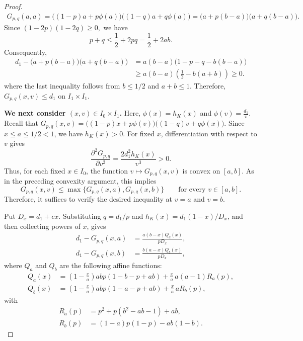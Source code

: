 \documentclass[11pt]{article}
\numberwithin{equation}{section}
\theoremstyle{definition}
\theoremstyle{remark}
\begin{document}
\begin{proof}
\begin{align*}
 G_{p,q}(a,a)
 =
 \bigl((1-p)a+p\phi(a)\bigr)
 \bigl((1-q)a+q\phi(a)\bigr)=
 \bigl(a+p(b-a)\bigr)
 \bigl(a+q(b-a)\bigr).
\end{align*}
Since
$
 (1-2p)(1-2q)\geq0,
$
we have
\begin{equation*}
 p+q\leq\frac12+2pq=\frac12+2ab.
\end{equation*}
Consequently,
\begin{align*}
 d_1-
 \bigl(a+p(b-a)\bigr)
 \bigl(a+q(b-a)\bigr)&=
 a(b-a)\bigl(1-p-q-b(b-a)\bigr)\\
 &\geq
 a(b-a)\left(\frac12-b(a+b)\right)\geq0.
\end{align*}
where the last inequality follows from $b\leq1/2$ and $a+b\leq1$.
Therefore, $G_{p,q}(x,v)\leq d_1$ on $I_1\times I_1$.

\textbf{We next consider $(x,v)\in I_0\times I_1$.} Here,
$
 \phi(x)=h_K(x)
$
and
$
 \phi(v)=\frac{d_1}{v}.
$
Recall that $G_{p,q}(x,v)
 =
 \bigl((1-p)x+p\phi(v)\bigr)
 \bigl((1-q)v+q\phi(x)\bigr).$
Since $x\leq a\leq1/2<1$, we have $h_K(x)>0$.
For fixed $x$, differentiation with respect to $v$ gives
\begin{equation*}
 \frac{\partial^2G_{p,q}}{\partial v^2}
 =
 \frac{2d_1^2h_K(x)}{v^3}>0.
\end{equation*}
Thus, for each fixed $x\in I_0$, the function
$v\mapsto G_{p,q}(x,v)$ is convex on $[a,b]$. As in the preceding
convexity argument, this implies
\begin{equation*}
 G_{p,q}(x,v)
 \leq
 \max\bigl\{G_{p,q}(x,a),G_{p,q}(x,b)\bigr\}
 \qquad\text{for every }v\in[a,b].
\end{equation*}
Therefore, it suffices to verify the desired inequality at
$v=a$ and $v=b$.

Put
$
 D_x=d_1+cx.
$
Substituting $q=d_1/p$ and
$h_K(x)=d_1(1-x)/D_x$, and then collecting powers of $x$, gives
\begin{align}
 d_1-G_{p,q}(x,a)
 &=
 \frac{a(b-x)Q_a(x)}{pD_x},
 \label{eq:Qa-factor}\\
 d_1-G_{p,q}(x,b)
 &=
 \frac{b(a-x)Q_b(x)}{pD_x},
 \label{eq:Qb-factor}
\end{align}
where $Q_a$ and $Q_b$ are the following affine functions:
\begin{align*}
 Q_a(x)
 &=
 \left(1-\frac{x}{a}\right)
 abp(1-b-p+ab)
 +
 \frac{x}{a}\,a(a-1)R_a(p),\\
 Q_b(x)
 &=
 \left(1-\frac{x}{a}\right)
 abp(1-a-p+ab)
 +
 \frac{x}{a}\,aR_b(p),
\end{align*}
with
\begin{align*}
 R_a(p)
 &=
 p^2+p(b^2-ab-1)+ab,\\
 R_b(p)
 &=
 (1-a)p(1-p)-ab(1-b).
\end{align*}


\end{proof}
\end{document}
